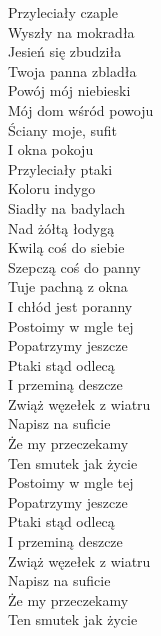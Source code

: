 
\begin{flushleft}
Przyleciały czaple   \\
Wyszły na mokradła    \\
Jesień się zbudziła  \\
Twoja panna zbladła   \\
Powój mój niebieski   \\
Mój dom wśród powoju   \\
Ściany moje, sufit   \\
I okna pokoju   \tab{} \\
\vskip 3mm
Przyleciały ptaki  \\
Koloru indygo \\
Siadły na badylach  \\
Nad żółtą łodygą  \\
Kwilą coś do siebie  \\
Szepczą coś do panny  \\
Tuje pachną z okna \\
I chłód jest poranny \\
\vskip 3mm
Postoimy w mgle tej \\
Popatrzymy jeszcze  \\
Ptaki stąd odlecą  \\
I przeminą deszcze  \\
Zwiąż węzełek z wiatru  \\
Napisz na suficie  \\
Że my przeczekamy  \\
Ten smutek jak życie \\
\vskip 3mm
Postoimy w mgle tej \\
Popatrzymy jeszcze  \\
Ptaki stąd odlecą  \\
I przeminą deszcze  \\
Zwiąż węzełek z wiatru  \\
Napisz na suficie  \\
Że my przeczekamy              \\
Ten smutek jak życie \\
\end{flushleft}
\clearpage
